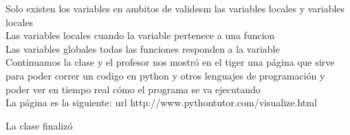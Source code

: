 \documentclass[letterpaper, 12pt, oneside]{article}%
\begin{document}
Solo existen los variables en ambitos de validesm las variables locales y variables locales\\
Las variables locales cuando la variable pertenece a una funcion\\
Las variables globales todas las funciones responden a la variable\\
Continuamos la clase y el profesor nos mostró en el tiger una página que sirve para poder correr un codigo en python  y otros lenguajes de programación y poder ver en tiempo real cómo el programa se va ejecutando\\
La página es la siguiente: url http://www.pythontutor.com/visualize.html

La clase finalizó
\end{document}
